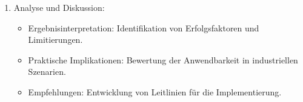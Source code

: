\begin{enumerate}
    \item Analyse und Diskussion:
    \begin{itemize}
        \item Ergebnisinterpretation: Identifikation von Erfolgsfaktoren und Limitierungen.
        \item Praktische Implikationen: Bewertung der Anwendbarkeit in industriellen Szenarien.
        \item Empfehlungen: Entwicklung von Leitlinien für die Implementierung.
    \end{itemize}
    
\end{enumerate}